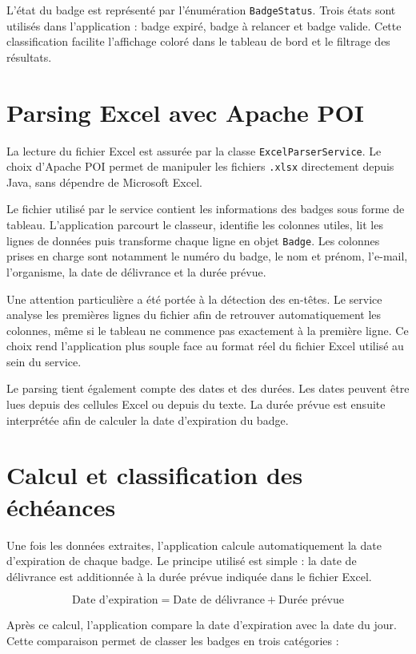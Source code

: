 \documentclass[12pt,a4paper,openany]{report}
\begin{document}
L'état du badge est représenté par l'énumération \texttt{BadgeStatus}. Trois
états sont utilisés dans l'application : badge expiré, badge à relancer et badge
valide. Cette classification facilite l'affichage coloré dans le tableau de bord
et le filtrage des résultats.

\section{Parsing Excel avec Apache POI}

La lecture du fichier Excel est assurée par la classe
\texttt{ExcelParserService}. Le choix d'Apache POI permet de manipuler les
fichiers \texttt{.xlsx} directement depuis Java, sans dépendre de Microsoft
Excel.

Le fichier utilisé par le service contient les informations des badges sous forme
de tableau. L'application parcourt le classeur, identifie les colonnes utiles,
lit les lignes de données puis transforme chaque ligne en objet \texttt{Badge}.
Les colonnes prises en charge sont notamment le numéro du badge, le nom et
prénom, l'e-mail, l'organisme, la date de délivrance et la durée prévue.

Une attention particulière a été portée à la détection des en-têtes. Le service
analyse les premières lignes du fichier afin de retrouver automatiquement les
colonnes, même si le tableau ne commence pas exactement à la première ligne. Ce
choix rend l'application plus souple face au format réel du fichier Excel utilisé
au sein du service.

Le parsing tient également compte des dates et des durées. Les dates peuvent être
lues depuis des cellules Excel ou depuis du texte. La durée prévue est ensuite
interprétée afin de calculer la date d'expiration du badge.

\section{Calcul et classification des échéances}

Une fois les données extraites, l'application calcule automatiquement la date
d'expiration de chaque badge. Le principe utilisé est simple : la date de
délivrance est additionnée à la durée prévue indiquée dans le fichier Excel.

\[
\text{Date d'expiration} = \text{Date de délivrance} + \text{Durée prévue}
\]

Après ce calcul, l'application compare la date d'expiration avec la date du jour.
Cette comparaison permet de classer les badges en trois catégories :
\end{document}
